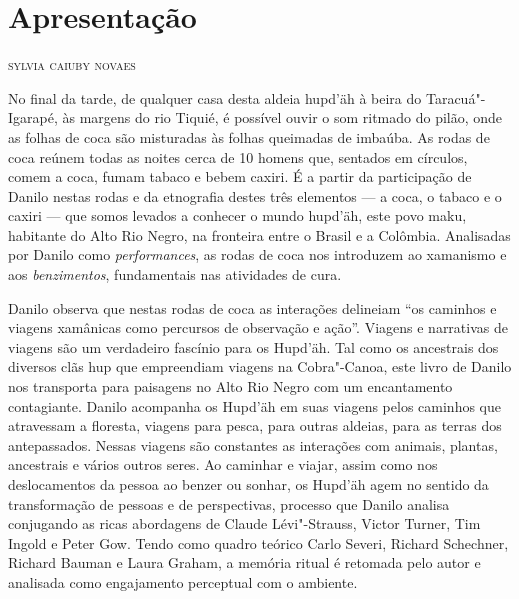 \chapter*{Apresentação\smallskip{}}


\begin{flushright}
\textsc{sylvia caiuby novaes}
\end{flushright}

\noindent{}No final da tarde, de qualquer casa desta aldeia hupd'äh à beira do
Taracuá"-Igarapé, às margens do rio Tiquié, é possível ouvir o som
ritmado do pilão, onde as folhas de coca são misturadas às folhas
queimadas de imbaúba. As rodas de coca reúnem todas as noites cerca de
10 homens que, sentados em círculos, comem a coca, fumam tabaco e bebem
caxiri. É a partir da participação de Danilo nestas rodas e da
etnografia destes três elementos --- a coca, o tabaco e o caxiri --- que
somos levados a conhecer o mundo hupd'äh, este povo maku, habitante do
Alto Rio Negro, na fronteira entre o Brasil e a Colômbia. Analisadas por
Danilo como \textit{performances}, as rodas de coca nos introduzem ao
xamanismo e aos \textit{benzimentos}, fundamentais nas atividades de cura.

Danilo observa que nestas rodas de coca as interações delineiam ``os
caminhos e viagens xamânicas como percursos de observação e ação''.
Viagens e narrativas de viagens são um verdadeiro fascínio para os
Hupd'äh. Tal como os ancestrais dos diversos clãs hup que empreendiam
viagens na Cobra"-Canoa, este livro de Danilo nos transporta para
paisagens no Alto Rio Negro com um encantamento contagiante. Danilo
acompanha os Hupd'äh em suas viagens pelos caminhos que atravessam a
floresta, viagens para pesca, para outras aldeias, para as terras dos
antepassados. Nessas viagens são constantes as interações com animais,
plantas, ancestrais e vários outros seres. Ao caminhar e viajar, assim
como nos deslocamentos da pessoa ao benzer ou sonhar, os Hupd'äh agem no
sentido da transformação de pessoas e de perspectivas, processo que
Danilo analisa conjugando as ricas abordagens de Claude Lévi"-Strauss,
Victor Turner, Tim Ingold e Peter Gow. Tendo como quadro teórico Carlo
Severi, Richard Schechner, Richard Bauman e Laura Graham, a memória
ritual é retomada pelo autor e analisada como engajamento perceptual com
o ambiente.

